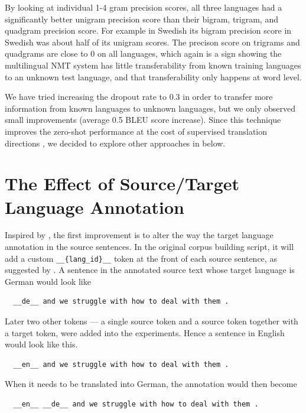 \documentclass[thesis,fonts=libertine]{cluu}
\begin{document}
By looking at individual 1-4 gram precision scores, all three languages had a significantly better unigram precision score than their bigram, trigram, and quadgram precision score. For example in Swedish its bigram precision score in Swedish was about half of its unigram scores. The precison score on trigrams and quadgrams are close to 0 on all languages, which again is a sign showing the multilingual NMT system has little transferability from known training languages to an unknown test language, and that transferability only happens at word level.

We have tried increasing the dropout rate to 0.3 in order to transfer more information from known languages to unknown languages, but we only observed small improvements (average 0.5 BLEU score increase). Since this technique improves the zero-shot performance at the cost of supervised translation directions \textcite{Arivazhagan:2019aa}, we decided to explore other approaches in below.

\section{The Effect of Source/Target Language Annotation}
\label{sec:results_source_and_target_annotation}

Inspired by \textcite{Blackwood:2018aa}, the first improvement is to alter the way the target language annotation in the source sentences. In the original corpus building script, it will add a custom \verb|__{lang_id}__| token at the front of each source sentence, as suggested by \textcite{Johnson:2016aa}. A sentence in the annotated source text whose target language is German would look like 

\begin{verbatim}
  __de__ and we struggle with how to deal with them .
\end{verbatim}

Later two other tokens --- a single source token and a source token together with a target token, were added into the experiments. Hence a sentence in English would look like this. 

\begin{verbatim}
  __en__ and we struggle with how to deal with them .
\end{verbatim}

When it needs to be translated into German, the annotation would then become 

\begin{verbatim}
  __en__ __de__ and we struggle with how to deal with them .
\end{verbatim}
\end{document}
